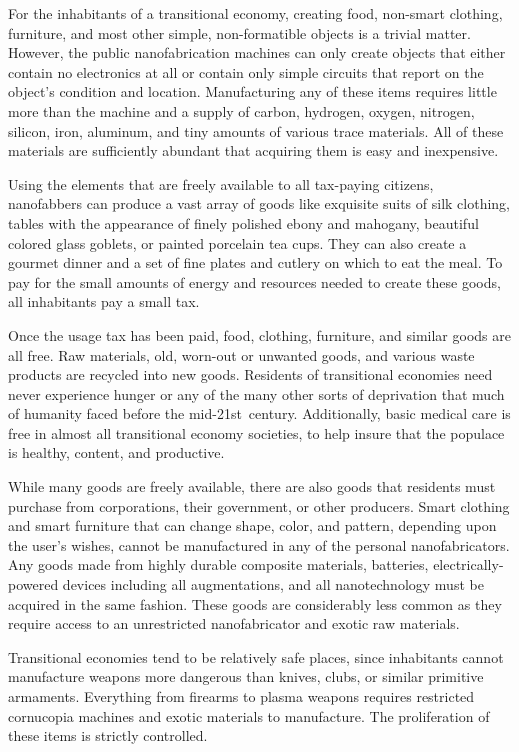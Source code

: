 For the inhabitants of a transitional economy, creating food, non-smart clothing, furniture, and most 
other simple, non-formatible objects is a trivial matter. 
However, the public nanofabrication machines can 
only create objects that either contain no electronics 
at all or contain only simple circuits that report on the 
object's condition and location. Manufacturing any 
of these items requires little more than the machine 
and a supply of carbon, hydrogen, oxygen, nitrogen, 
silicon, iron, aluminum, and tiny amounts of various 
trace materials. All of these materials are sufficiently 
abundant that acquiring them is easy and inexpensive.

Using the elements that are freely available to all 
tax-paying citizens, nanofabbers can produce a vast 
array of goods like exquisite suits of silk clothing, 
tables with the appearance of finely polished ebony 
and mahogany, beautiful colored glass goblets, or 
painted porcelain tea cups. They can also create a 
gourmet dinner and a set of fine plates and cutlery on 
which to eat the meal. To pay for the small amounts 
of energy and resources needed to create these goods, 
all inhabitants pay a small tax.

Once the usage tax has been paid, food, clothing, 
furniture, and similar goods are all free. Raw materials, old, worn-out or unwanted goods, and various 
waste products are recycled into new goods. Residents 
of transitional economies need never experience 
hunger or any of the many other sorts of deprivation 
that much of humanity faced before the mid-21st century. Additionally, basic medical care is free in almost 
all transitional economy societies, to help insure that 
the populace is healthy, content, and productive.

While many goods are freely available, there are 
also goods that residents must purchase from corporations, their government, or other producers. Smart 
clothing and smart furniture that can change shape, 
color, and pattern, depending upon the user's wishes, 
cannot be manufactured in any of the personal nanofabricators. Any goods made from highly durable 
composite materials, batteries, electrically-powered 
devices including all augmentations, and all nanotechnology must be acquired in the same fashion. These 
goods are considerably less common as they require 
access to an unrestricted nanofabricator and exotic 
raw materials.

Transitional economies tend to be relatively safe 
places, since inhabitants cannot manufacture weapons 
more dangerous than knives, clubs, or similar primitive armaments. Everything from firearms to plasma 
weapons requires restricted cornucopia machines and 
exotic materials to manufacture. The proliferation of 
these items is strictly controlled.

